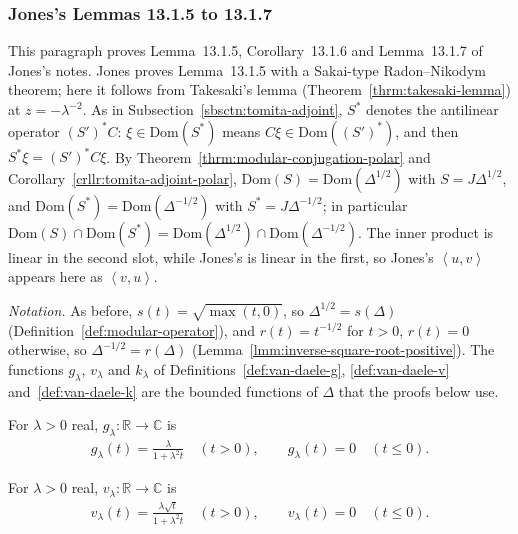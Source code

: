 \subsubsection{Jones's Lemmas 13.1.5 to 13.1.7}

This paragraph proves Lemma~13.1.5, Corollary~13.1.6 and Lemma~13.1.7 of Jones's notes. Jones proves Lemma~13.1.5 with a Sakai-type Radon--Nikodym theorem; here it follows from Takesaki's lemma (Theorem~\ref{thrm:takesaki-lemma}) at $z = -\lambda^{-2}$. As in Subsection~\ref{sbsctn:tomita-adjoint}, $S^*$ denotes the antilinear operator $(S')^*C$: $\xi \in \text{Dom}(S^*)$ means $C\xi \in \text{Dom}((S')^*)$, and then $S^*\xi = (S')^*C\xi$. By Theorem~\ref{thrm:modular-conjugation-polar} and Corollary~\ref{crllr:tomita-adjoint-polar}, $\text{Dom}(S) = \text{Dom}(\Delta^{1/2})$ with $S = J\Delta^{1/2}$, and $\text{Dom}(S^*) = \text{Dom}(\Delta^{-1/2})$ with $S^* = J\Delta^{-1/2}$; in particular $\text{Dom}(S) \cap \text{Dom}(S^*) = \text{Dom}(\Delta^{1/2}) \cap \text{Dom}(\Delta^{-1/2})$. The inner product is linear in the second slot, while Jones's is linear in the first, so Jones's $\left< u, v \right>$ appears here as $\left< v, u \right>$.

\emph{Notation.} As before, $s(t) = \sqrt{\max(t, 0)}$, so $\Delta^{1/2} = s(\Delta)$ (Definition~\ref{def:modular-operator}), and $r(t) = t^{-1/2}$ for $t > 0$, $r(t) = 0$ otherwise, so $\Delta^{-1/2} = r(\Delta)$ (Lemma~\ref{lmm:inverse-square-root-positive}). The functions $g_\lambda$, $v_\lambda$ and $k_\lambda$ of Definitions~\ref{def:van-daele-g}, \ref{def:van-daele-v} and~\ref{def:van-daele-k} are the bounded functions of $\Delta$ that the proofs below use.

\begin{definition}
    \label{def:van-daele-g}
    \leanok
    For $\lambda > 0$ real, $g_\lambda : \mathbb{R} \to \mathbb{C}$ is
    \begin{align}
        g_\lambda(t) = \frac{\lambda}{1 + \lambda^2 t} \quad (t > 0), \qquad g_\lambda(t) = 0 \quad (t \le 0).
    \end{align}
\end{definition}

\begin{definition}
    \label{def:van-daele-v}
    \leanok
    For $\lambda > 0$ real, $v_\lambda : \mathbb{R} \to \mathbb{C}$ is
    \begin{align}
        v_\lambda(t) = \frac{\lambda\sqrt{t}}{1 + \lambda^2 t} \quad (t > 0), \qquad v_\lambda(t) = 0 \quad (t \le 0).
    \end{align}
\end{definition}


